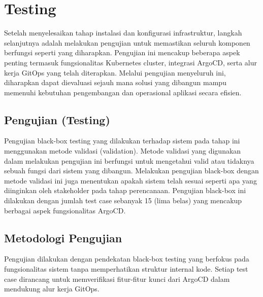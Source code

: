 \section{Testing}
Setelah menyelesaikan tahap instalasi dan konfigurasi infrastruktur, langkah
selanjutnya adalah melakukan pengujian untuk memastikan seluruh komponen
berfungsi seperti yang diharapkan. Pengujian ini mencakup beberapa aspek
penting termasuk fungsionalitas Kubernetes cluster, integrasi ArgoCD, serta
alur kerja GitOps yang telah diterapkan. Melalui pengujian menyeluruh ini,
diharapkan dapat dievaluasi sejauh mana solusi yang dibangun mampu memenuhi
kebutuhan pengembangan dan operasional aplikasi secara efisien.

\subsection{Pengujian (Testing)}\label{sec:bab4_pengujian}
Pengujian black-box testing yang dilakukan terhadap sistem pada tahap ini
menggunakan metode validasi (validation). Metode validasi yang digunakan dalam
melakukan pengujian ini berfungsi untuk mengetahui valid atau tidaknya sebuah
fungsi dari sistem yang dibangun. Melakukan pengujian black-box dengan metode
validasi ini juga menentukan apakah sistem telah sesuai seperti apa yang
diinginkan oleh stakeholder pada tahap perencanaan. Pengujian black-box ini
dilakukan dengan jumlah test case sebanyak 15 (lima belas) yang mencakup
berbagai aspek fungsionalitas ArgoCD.

\subsection{Metodologi Pengujian}
Pengujian dilakukan dengan pendekatan black-box testing yang berfokus pada
fungsionalitas sistem tanpa memperhatikan struktur internal kode. Setiap test
case dirancang untuk memverifikasi fitur-fitur kunci dari ArgoCD dalam
mendukung alur kerja GitOps.

